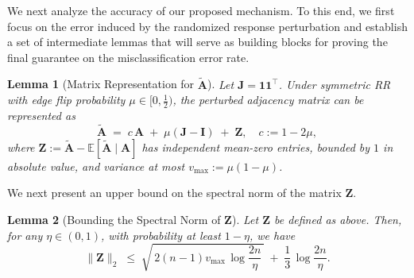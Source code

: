 \documentclass[11pt]{article}
\theoremstyle{plain}
\newtheorem{lemma}{Lemma}[section]
\theoremstyle{definition}
\theoremstyle{remark}
\begin{document}
We next analyze the accuracy of our proposed mechanism. To this end, we first focus on the error induced by the randomized response perturbation and establish a set of intermediate lemmas that will serve as building blocks for proving the final guarantee on the misclassification error rate.

\begin{lemma}[Matrix Representation for $\widetilde{\mathbf{A}}$]
\label{lem:decomp_explicit}
Let $\mathbf{J}=\mathbf{1}\mathbf{1}^\top$. Under symmetric RR with edge flip probability $\mu\in[0,\tfrac12)$, the perturbed adjacency matrix can be represented as
\[
\widetilde{\mathbf{A}}
\;=\;
c\,\mathbf{A} \;+\; \mu(\mathbf{J}-\mathbf{I}) \;+\; \mathbf{Z},
\quad
c := 1 - 2\mu,
\]
where $\mathbf{Z} := \widetilde{\mathbf{A}} - \mathbb{E}[\widetilde{\mathbf{A}}\mid \mathbf{A}]$ has independent mean-zero entries, bounded by $1$ in absolute value, and variance at most $v_{\max} := \mu(1-\mu)$.
\end{lemma}
We next present an upper bound on the spectral norm of the matrix $\mathbf{Z}$. 
\begin{lemma}[Bounding the Spectral Norm of $\mathbf{Z}$]
\label{lem:bern_Z}
Let $\mathbf{Z}$ be defined as above. Then, for any $\eta\in(0,1)$, with probability at least $1-\eta$, we have
\[
\|\mathbf{Z}\|_2 
\;\le\; 
\sqrt{\,2(n-1)v_{\max}\,\log\frac{2n}{\eta}\,}
\;+\;\frac{1}{3}\,\log\frac{2n}{\eta}.
\]
\end{lemma}
\end{document}
